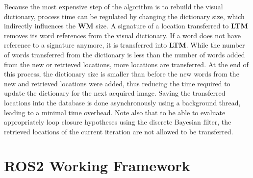 Because the most expensive step of the algorithm is to rebuild the visual dictionary, process time can be regulated by changing the dictionary size, which indirectly influences the \textbf{WM} size. A signature of a location transferred to \textbf{LTM} removes its word references from the visual dictionary. If a word does not have reference to a signature anymore, it is transferred into \textbf{LTM}. While the number of words transferred from the dictionary is less than the number of words added from the new or retrieved locations, more locations are transferred. At the end of this process, the dictionary size is smaller than before the new words from the new and retrieved locations were added, thus reducing the time required to update the dictionary for the next acquired image. Saving the transferred locations into the database is done asynchronously using a background thread, leading to a minimal time overhead. Note also that to be able to evaluate appropriately loop closure hypotheses using the discrete Bayesian filter, the retrieved locations of the current iteration are not allowed to be transferred.

\section{ROS2 Working Framework\label{sec:ros2_working_framework}}

